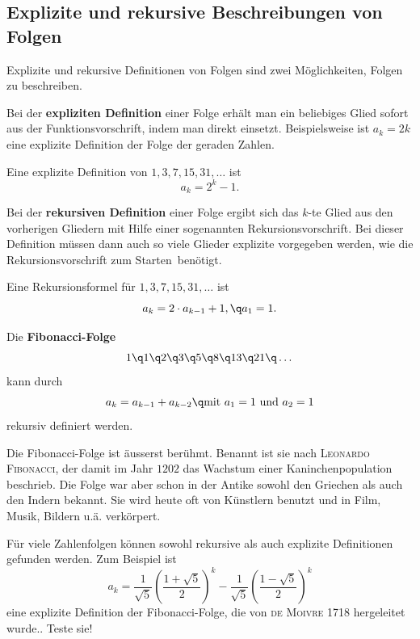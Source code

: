 \documentclass[%
11pt,%
twoside,%
titlepage,%
german,%
headsepline%
]{scrartcl}
\begin{document}
\subsection{Explizite und rekursive Beschreibungen von Folgen}
Explizite und rekursive Definitionen von Folgen sind zwei M\"oglichkeiten, Folgen zu beschreiben.

Bei der \textbf{expliziten Definition} einer Folge erh\"alt man ein beliebiges Glied sofort aus der Funktionsvorschrift, indem man direkt einsetzt. Beispielsweise ist $a_k=2k$ eine explizite Definition der Folge der geraden Zahlen.

\begin{bsp}
Eine explizite Definition von $1,3,7,15,31,\dots$
ist
$$a_k=2^k-1.$$
\end{bsp}

Bei der \textbf{rekursiven Definition} einer Folge ergibt sich das $k$-te Glied aus den vorherigen Gliedern mit Hilfe einer sogenannten Rekursionsvorschrift. Bei dieser Definition m\"ussen dann auch so viele Glieder explizite vorgegeben werden, wie die Rekursionsvorschrift \glqq zum Starten\grqq\ ben\"otigt.

\begin{bsp}
Eine Rekursionsformel f\"ur $1,3,7,15,31,\dots$
ist
$$a_k=2\cdot a_{k-1}+1,\q a_1=1.$$
\end{bsp}

\begin{bsp}
Die \textbf{Fibonacci-Folge}
$$1\q1\q2\q3\q5\q8\q13\q21\q\dots$$
kann durch
$$a_k=a_{k-1}+a_{k-2}\q\text{mit }a_1=1\text{ und }a_2=1$$
rekursiv definiert werden.
\end{bsp}

\begin{bem}
Die Fibonacci-Folge ist \"ausserst ber\"uhmt. Benannt ist sie nach \textsc{Leonardo Fibonacci}, der damit im Jahr $1202$ das Wachstum einer Kaninchenpopulation beschrieb. Die Folge war aber schon in der Antike sowohl den Griechen als auch den Indern bekannt. Sie wird heute oft von K\"unstlern benutzt und in Film, Musik, Bildern u.\"a. verk\"orpert.
\end{bem}

\begin{bem}
F\"ur viele Zahlenfolgen k\"onnen sowohl rekursive als auch explizite Definitionen gefunden werden. Zum Beispiel ist
$$a_k=\frac{1}{\sqrt{5}}\left(\frac{1+\sqrt{5}}{2}\right)^k - \frac{1}{\sqrt{5}}\left(\frac{1-\sqrt{5}}{2}\right)^k$$
eine explizite Definition der Fibonacci-Folge, die von \textsc{de Moivre} 1718 hergeleitet wurde.. Teste sie!
\end{bem}
\end{document}
